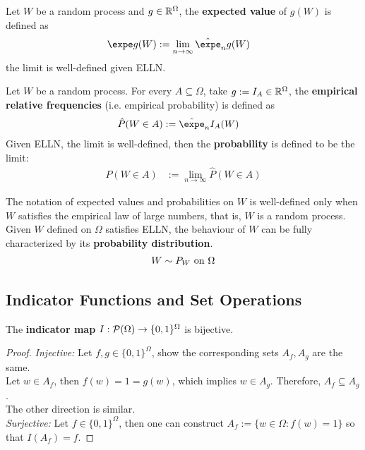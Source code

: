 \documentclass{article}
\begin{document}
   	\begin{definition}
   		Let $W$ be a random process and $g \in \mathbb{R}^\Omega$, the \textbf{expected value} of $g(W)$ is defined as
   		\begin{align}
   			\expe g(W) &:= \lim_{n \to \infty} \hat{\expe}_ng(W)
   		\end{align}
   		the limit is well-defined given ELLN.
   	\end{definition}
   	
   	\begin{definition}
   		Let $W$ be a random process. For every $A \subseteq \Omega$, take $g := I_A \in \mathbb{R}^\Omega$, the \textbf{empirical relative frequencies} (i.e. empirical probability) is defined as
   		\begin{align}
   			\hat{P}(W \in A) &:= \hat{\expe}_n I_A(W)
   		\end{align}
   		Given ELLN, the limit is well-defined, then the \textbf{probability} is defined to be the limit:
   		\begin{align}
   			P(W \in A) &:= \lim_{n \to \infty} \hat{P}(W \in A)
   		\end{align}
   	\end{definition}
   	
   	\begin{remark}
   		The notation of expected values and probabilities on $W$ is well-defined only when $W$ satisfies the empirical law of large numbers, that is, $W$ is a random process. \\
   		Given $W$ defined on $\Omega$ satisfies ELLN, the behaviour of $W$ can be fully characterized by its \textbf{probability distribution}.
   		\begin{align}
   			W \sim P_W \text{{ on }} \Omega
   		\end{align}
   	\end{remark}

	\subsection{Indicator Functions and Set Operations}
	\begin{proposition}
		The \textbf{indicator map} $I: \mathcal{{P}}(\Omega) \to \{0, 1\}^\Omega$ is bijective.
	\end{proposition}
	
	\begin{proof}
		\emph{Injective:} Let $f, g \in \{0, 1\}^\Omega$, show the corresponding sets $A_f, A_g$ are the same. \\
		Let $w \in A_f$, then $f(w) = 1 = g(w)$, which implies $w \in A_g$. Therefore, $A_f \subseteq A_g$. \\
		The other direction is similar. \\
		\emph{Surjective:} Let $f \in \{0, 1\}^\Omega$, then one can construct $A_f := \{w \in \Omega: f(w) = 1\}$ so that $I(A_f) = f$.
	\end{proof}
	
\end{document}
